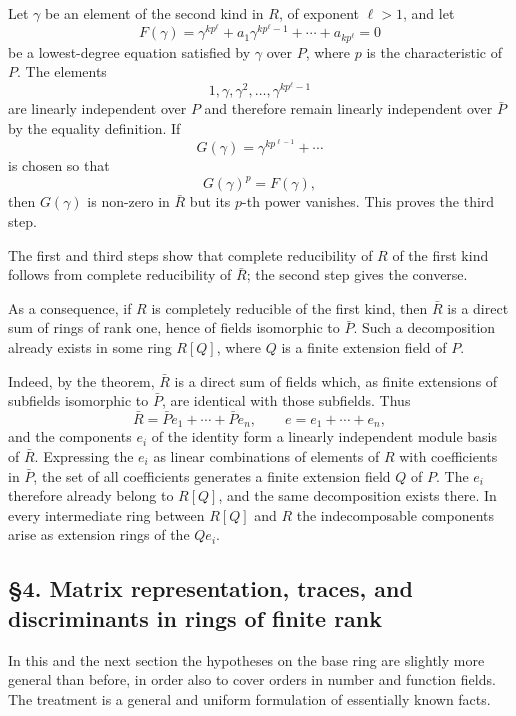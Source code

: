 \documentclass[11pt]{article}
\begin{document}
Let \(\gamma\) be an element of the second kind in \(R\), of exponent
\(\ell>1\), and let \[
  F(\gamma)=\gamma^{kp^{\ell}}+a_1\gamma^{kp^{\ell}-1}+
\cdots+a_{kp^{\ell}}=0
\] be a lowest-degree equation satisfied by \(\gamma\) over \(P\), where
\(p\) is the characteristic of \(P\). The elements \[
  1,\gamma,
\gamma^2,
\ldots,
\gamma^{kp^{\ell}-1}
\] are linearly independent over \(P\) and therefore remain linearly
independent over \(\bar P\) by the equality definition. If \[
  G(\gamma)=\gamma^{kp^{\ell-1}}+
\cdots
\] is chosen so that \[
  G(\gamma)^p=F(\gamma),
\] then \(G(\gamma)\) is non-zero in \(\bar R\) but its \(p\)-th power
vanishes. This proves the third step.

The first and third steps show that complete reducibility of \(R\) of
the first kind follows from complete reducibility of \(\bar R\); the
second step gives the converse.

As a consequence, if \(R\) is completely reducible of the first kind,
then \(\bar R\) is a direct sum of rings of rank one, hence of fields
isomorphic to \(\bar P\). Such a decomposition already exists in some
ring \(R[Q]\), where \(Q\) is a finite extension field of \(P\).

Indeed, by the theorem, \(\bar R\) is a direct sum of fields which, as
finite extensions of subfields isomorphic to \(\bar P\), are identical
with those subfields. Thus \[
  \bar R=\bar P e_1+
\cdots+\bar P e_n,
  \qquad e=e_1+
\cdots+e_n,
\] and the components \(e_i\) of the identity form a linearly
independent module basis of \(\bar R\). Expressing the \(e_i\) as linear
combinations of elements of \(R\) with coefficients in \(\bar P\), the
set of all coefficients generates a finite extension field \(Q\) of
\(P\). The \(e_i\) therefore already belong to \(R[Q]\), and the same
decomposition exists there. In every intermediate ring between \(R[Q]\)
and \(R\) the indecomposable components arise as extension rings of the
\(Qe_i\).

\subsection{§4. Matrix representation, traces, and discriminants in
rings of finite
rank}\label{matrix-representation-traces-and-discriminants-in-rings-of-finite-rank}

In this and the next section the hypotheses on the base ring are
slightly more general than before, in order also to cover orders in
number and function fields. The treatment is a general and uniform
formulation of essentially known facts.
\end{document}
